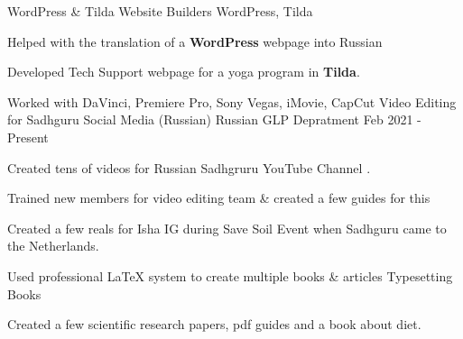 \begin{cventries}
  \cventry
    {WordPress \& Tilda}
    {Website Builders} 
    {WordPress, Tilda} %
    {} %
    {
      \begin{cvitems} %
        \item {Helped with the translation of a 
            \textbf{WordPress} webpage into Russian 
            }
        \item {Developed Tech Support webpage for a yoga program
            in \textbf{Tilda}.}
      \end{cvitems}
    }

  \cventry
    {Worked with DaVinci, Premiere Pro, Sony Vegas, iMovie, CapCut}
    {Video Editing for Sadhguru Social Media (Russian)} 
    {Russian GLP Depratment} %
    {Feb 2021 - Present} %
    {
      \begin{cvitems} %
      \item {Created tens of videos for Russian Sadhgruru YouTube Channel .}
        \item {Trained new members for video editing team \& created a few guides for this }
        \item {Created a few reals for Isha IG during Save Soil Event when Sadhguru came to the Netherlands.}
      \end{cvitems}
    }
  \cventry
    {Used professional LaTeX system to create multiple books \& articles}
    {Typesetting Books} 
    {} %
    {} %
    {
      \begin{cvitems} %
      \item {Created a few scientific research papers, pdf guides and a book about diet.}
      \end{cvitems}
    }

\end{cventries}
